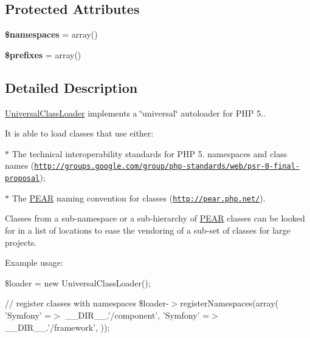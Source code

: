 \subsection*{\-Protected \-Attributes}
\begin{DoxyCompactItemize}
\item 
\hypertarget{class_symfony_1_1_component_1_1_http_foundation_1_1_universal_class_loader_a5a7d9500de9f7c938443d65cef9a074e}{
{\bfseries \$namespaces} = array()}
\label{class_symfony_1_1_component_1_1_http_foundation_1_1_universal_class_loader_a5a7d9500de9f7c938443d65cef9a074e}

\item 
\hypertarget{class_symfony_1_1_component_1_1_http_foundation_1_1_universal_class_loader_a8dd2685d77e3731afd50eaa21c4f2055}{
{\bfseries \$prefixes} = array()}
\label{class_symfony_1_1_component_1_1_http_foundation_1_1_universal_class_loader_a8dd2685d77e3731afd50eaa21c4f2055}

\end{DoxyCompactItemize}


\subsection{\-Detailed \-Description}
\hyperlink{class_symfony_1_1_component_1_1_http_foundation_1_1_universal_class_loader}{\-Universal\-Class\-Loader} implements a \char`\"{}universal\char`\"{} autoloader for \-P\-H\-P 5..

\-It is able to load classes that use either\-:

$\ast$ \-The technical interoperability standards for \-P\-H\-P 5. namespaces and class names (\href{http://groups.google.com/group/php-standards/web/psr-0-final-proposal}{\tt http\-://groups.\-google.\-com/group/php-\/standards/web/psr-\/0-\/final-\/proposal});

$\ast$ \-The \hyperlink{namespace_p_e_a_r}{\-P\-E\-A\-R} naming convention for classes (\href{http://pear.php.net/}{\tt http\-://pear.\-php.\-net/}).

\-Classes from a sub-\/namespace or a sub-\/hierarchy of \hyperlink{namespace_p_e_a_r}{\-P\-E\-A\-R} classes can be looked for in a list of locations to ease the vendoring of a sub-\/set of classes for large projects.

\-Example usage\-:

\$loader = new \-Universal\-Class\-Loader();

// register classes with namespaces \$loader-\/$>$register\-Namespaces(array( '\-Symfony' =$>$ \-\_\-\-\_\-\-D\-I\-R\-\_\-\-\_\-.'/component', '\-Symfony' =$>$ \-\_\-\-\_\-\-D\-I\-R\-\_\-\-\_\-.'/framework', ));

